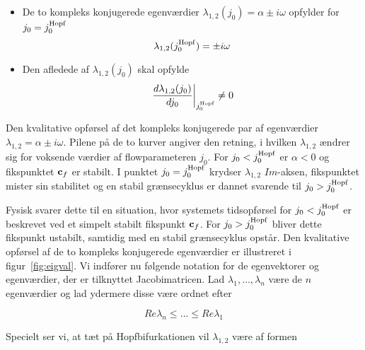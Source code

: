 \begin{itemize}
\item De to kompleks konjugerede egenv{\ae}rdier 
      $\lambda_{1,2}(j_0)=\alpha\pm i\omega$ opfylder for 
      $j_0=j_0^{\rm Hopf}$ 
      $$
       \lambda_{1,2}(j_0^{\rm Hopf}) = \pm i\omega
      $$
\item Den afledede af $\lambda_{1,2}(j_0)$ skal opfylde
      $$
       \left.\frac{d\lambda_{1,2}(j_0)}{dj_0}\right|_{j_0^{\rm Hopf}} 
       \neq 0
      $$
\end{itemize}

{
\caption{\protect\capsize
Den kvalitative opf{\o}rsel af det kompleks konjugerede par
af egenv{\ae}rdier $\lambda_{1,2}=\alpha\pm i\omega$.
Pilene p{\aa} de to kurver angiver den retning, i hvilken
$\lambda_{1,2}$ {\ae}ndrer sig for voksende v{\ae}rdier af
flowparameteren $j_0$. For $j_0 < j_0^{\rm Hopf}$ er
$\alpha<0$ og fikspunktet ${\bf c}_f$ er stabilt. I punktet
$j_0 = j_0^{\rm Hopf}$ krydser $\lambda_{1,2}$ $Im$-aksen,
fikspunktet mister sin stabilitet og en stabil
gr{\ae}nsecyklus er dannet svarende til $j_0 > j_0^{\rm
Hopf}$.}
\label{fig:eigval}
}

Fysisk svarer dette til en situation, hvor systemets
tidsopf{\o}rsel for $j_0 < j_0^{\rm Hopf}$ er beskrevet ved
et simpelt stabilt fikspunkt ${\bf c}_f$. For $j_0 >
j_0^{\rm Hopf}$ bliver dette fikspunkt ustabilt, samtidig
med en stabil gr{\ae}nsecyklus opst{\aa}r. Den kvalitative
opf{\o}rsel af de to kompleks konjugerede egenv{\ae}rdier
er illustreret i figur~\ref{fig:eigval}. Vi indf{\o}rer nu
f{\o}lgende notation for de egenvektorer og
egenv{\ae}rdier, der er til\-knyt\-tet Jacobimatricen. Lad
$\lambda_1,\ldots,\lambda_n$ v{\ae}re de $n$
egenv{\ae}rdier og lad ydermere disse v{\ae}re ordnet efter


\begin{equation}
 Re \lambda_n \leq \ldots \leq Re \lambda_1
\end{equation}

Specielt ser vi, at t{\ae}t p{\aa} Hopfbifurkationen vil 
$\lambda_{1,2}$ v{\ae}re af formen

